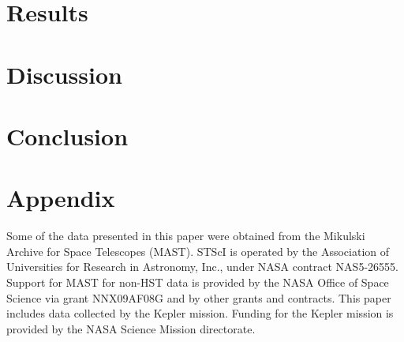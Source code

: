 \documentclass[useAMS, usenatbib, preprint, 12pt]{aastex}
\begin{document}
\section{Results}
\label{section:results}





\section{Discussion}
\label{section:discussion}





\section{Conclusion}
\label{section:conclusion}

\section{Appendix}
\label{section:appendix}


Some of the data presented in this paper were obtained from the Mikulski
Archive for Space Telescopes (MAST).
STScI is operated by the Association of Universities for Research in
Astronomy, Inc., under NASA contract NAS5-26555.
Support for MAST for non-HST data is provided by the NASA Office of Space
Science via grant NNX09AF08G and by other grants and contracts.
This paper includes data collected by the Kepler mission. Funding for the
Kepler mission is provided by the NASA Science Mission directorate.



\end{document}

